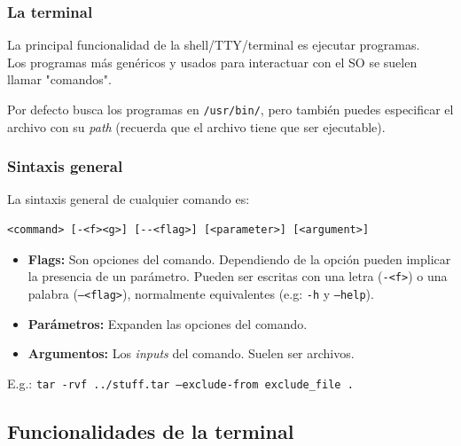 \documentclass[aspectratio=43]{beamer}
\begin{document}
\begin{frame}
    \frametitle{La terminal}
    La principal funcionalidad de la shell/TTY/terminal es ejecutar programas.\\
    Los programas más genéricos y usados para interactuar con el SO se suelen llamar "comandos".\newline

    Por defecto busca los programas en \texttt{/usr/bin/}, pero también puedes especificar el archivo con su \textit{path} (recuerda que el archivo tiene que ser ejecutable).

\end{frame}


\begin{frame}[fragile]  %
    \frametitle{Sintaxis general}

    La sintaxis general de cualquier comando es:\\

    \begin{block}{}  %
        \begin{verbatim}
<command> [-<f><g>] [--<flag>] [<parameter>] [<argument>]
        \end{verbatim}
    \end{block}

    \begin{itemize}
        \item \textbf{Flags:} Son opciones del comando. Dependiendo de la opción pueden implicar la presencia de un parámetro. Pueden ser escritas con una letra (\texttt{-<f>}) o una palabra (\texttt{--<flag>}), normalmente equivalentes (e.g: \texttt{-h} y \texttt{--help}).
        \item \textbf{Parámetros:} Expanden las opciones del comando.
        \item \textbf{Argumentos:} Los \textit{inputs} del comando. Suelen ser archivos.
    \end{itemize}
    
    E.g.: \texttt{tar -rvf ../stuff.tar --exclude-from exclude\_file .}

\end{frame}


\subsection{Funcionalidades de la terminal}
\end{document}
